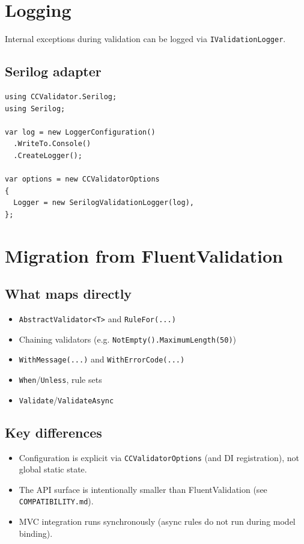\documentclass[12pt]{article}
\begin{document}
\section{Logging}

Internal exceptions during validation can be logged via \texttt{IValidationLogger}.

\subsection{Serilog adapter}
\begin{lstlisting}
using CCValidator.Serilog;
using Serilog;

var log = new LoggerConfiguration()
  .WriteTo.Console()
  .CreateLogger();

var options = new CCValidatorOptions
{
  Logger = new SerilogValidationLogger(log),
};
\end{lstlisting}

\section{Migration from FluentValidation}

\subsection{What maps directly}
\begin{itemize}[noitemsep]
  \item \texttt{AbstractValidator<T>} and \texttt{RuleFor(...)}
  \item Chaining validators (e.g. \texttt{NotEmpty().MaximumLength(50)})
  \item \texttt{WithMessage(...)} and \texttt{WithErrorCode(...)}
  \item \texttt{When}/\texttt{Unless}, rule sets
  \item \texttt{Validate}/\texttt{ValidateAsync}
\end{itemize}

\subsection{Key differences}
\begin{itemize}[noitemsep]
  \item Configuration is explicit via \texttt{CCValidatorOptions} (and DI registration), not global static state.
  \item The API surface is intentionally smaller than FluentValidation (see \texttt{COMPATIBILITY.md}).
  \item MVC integration runs synchronously (async rules do not run during model binding).
\end{itemize}
\end{document}
